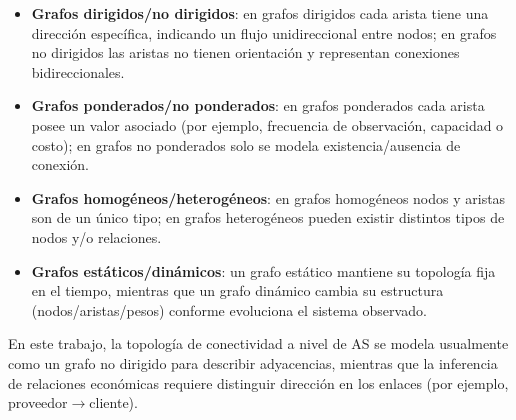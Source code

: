 \begin{itemize}
    \item \textbf{Grafos dirigidos/no dirigidos}: en grafos dirigidos cada arista tiene una dirección específica, indicando un flujo unidireccional entre nodos; en grafos no dirigidos las aristas no tienen orientación y representan conexiones bidireccionales.
    \item \textbf{Grafos ponderados/no ponderados}: en grafos ponderados cada arista posee un valor asociado (por ejemplo, frecuencia de observación, capacidad o costo); en grafos no ponderados solo se modela existencia/ausencia de conexión.
    \item \textbf{Grafos homogéneos/heterogéneos}: en grafos homogéneos nodos y aristas son de un único tipo; en grafos heterogéneos pueden existir distintos tipos de nodos y/o relaciones.
    \item \textbf{Grafos estáticos/dinámicos}: un grafo estático mantiene su topología fija en el tiempo, mientras que un grafo dinámico cambia su estructura (nodos/aristas/pesos) conforme evoluciona el sistema observado.
\end{itemize}

En este trabajo, la topología de conectividad a nivel de AS se modela usualmente como un grafo no dirigido para describir adyacencias, mientras que la inferencia de relaciones económicas requiere distinguir dirección en los enlaces (por ejemplo, proveedor$\rightarrow$cliente).


